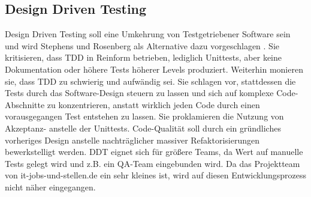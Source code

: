   \subsection{Design Driven Testing}
  Design Driven Testing soll eine Umkehrung von Testgetriebener Software sein und wird Stephens und Rosenberg als Alternative dazu vorgeschlagen \citep{stephens_design_2010}. Sie kritisieren, dass TDD in Reinform betrieben, lediglich Unittests, aber keine Dokumentation oder höhere Tests höherer Levels produziert. Weiterhin monieren sie, dass TDD zu schwierig und aufwändig sei. Sie schlagen vor, stattdessen die Tests durch das Software-Design steuern zu lassen und sich auf komplexe Code-Abschnitte zu konzentrieren, anstatt wirklich jeden Code durch einen vorausgegangen Test entstehen zu lassen. Sie proklamieren die Nutzung von Akzeptanz- anstelle der Unittests. Code-Qualität soll durch ein gründliches vorheriges Design anstelle nachträglicher massiver Refaktorisierungen bewerkstelligt werden.
  DDT eignet sich für größere Teams, da Wert auf manuelle Tests gelegt wird und z.B. ein QA-Team eingebunden wird. Da das Projektteam von it-jobs-und-stellen.de ein sehr kleines ist, wird auf diesen Entwicklungsprozess nicht näher eingegangen.